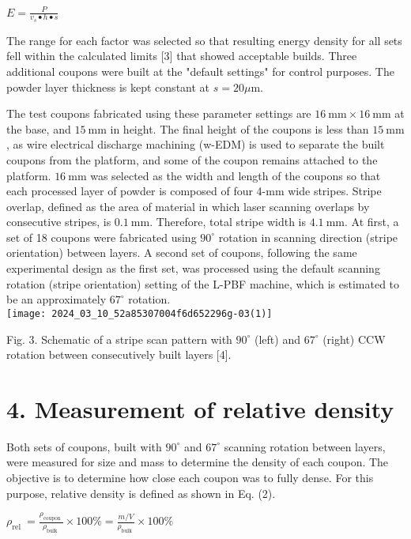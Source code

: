 \documentclass[10pt]{article}
\begin{document}
$E=\frac{P}{v_{s} \bullet h \bullet s}$

The range for each factor was selected so that resulting energy density for all sets fell within the calculated limits [3] that showed acceptable builds. Three additional coupons were built at the "default settings" for control purposes. The powder layer thickness is kept constant at $s=20 \mu \mathrm{m}$.

The test coupons fabricated using these parameter settings are $16 \mathrm{~mm} \times 16 \mathrm{~mm}$ at the base, and $15 \mathrm{~mm}$ in height. The final height of the coupons is less than $15 \mathrm{~mm}$, as wire electrical discharge machining (w-EDM) is used to separate the built coupons from the platform, and some of the coupon remains attached to the platform. $16 \mathrm{~mm}$ was selected as the width and length of the coupons so that each processed layer of powder is composed of four 4-mm wide stripes. Stripe overlap, defined as the area of material in which laser scanning overlaps by consecutive stripes, is $0.1 \mathrm{~mm}$. Therefore, total stripe width is $4.1 \mathrm{~mm}$. At first, a set of 18 coupons were fabricated using $90^{\circ}$ rotation in scanning direction (stripe orientation) between layers. A second set of coupons, following the same experimental design as the first set, was processed using the default scanning rotation (stripe orientation) setting of the L-PBF machine, which is estimated to be an approximately $67^{\circ}$ rotation.\\
\texttt{[image: 2024\_03\_10\_52a85307004f6d652296g-03(1)]}

Fig. 3. Schematic of a stripe scan pattern with $90^{\circ}$ (left) and $67^{\circ}$ (right) CCW rotation between consecutively built layers [4].

\section*{4. Measurement of relative density}
Both sets of coupons, built with $90^{\circ}$ and $67^{\circ}$ scanning rotation between layers, were measured for size and mass to determine the density of each coupon. The objective is to determine how close each coupon was to fully dense. For this purpose, relative density is defined as shown in Eq. (2).

$\rho_{\text {rel }}=\frac{\rho_{\text {coupon }}}{\rho_{\text {bulk }}} \times 100 \%=\frac{m / V}{\rho_{\text {bulk }}} \times 100 \%$
\end{document}
